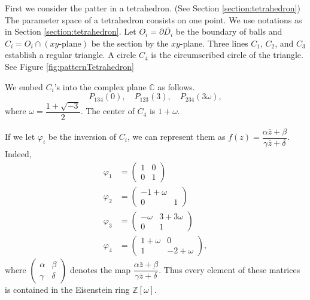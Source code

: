 \documentclass[suppldata, dvipdfmx]{interact}
\theoremstyle{plain}%
\theoremstyle{definition}
\theoremstyle{remark}
\theoremstyle{problemstyle}
\begin{document}
First we consider the patter in a tetrahedron. (See Section \ref{section:tetrahedron}) 
The parameter space of a tetrahedron consists on one point.
We use notations as in Section \ref{section:tetrahedron}.  
Let $O_i = \partial \overline{D_i}$ be the boundary of balls and $C_i= O_i\cap(xy\text{-plane})$ be the section by the $xy$-plane.  
Three lines $C_1$, $C_2$, and $C_3$ establish a regular triangle. 
A circle $C_4$ is the circumscribed circle of the triangle.  
See Figure \ref{fig:patternTetrahedron}

We embed $C_i$'s into the complex plane $\mathbb{C}$ as follows.
\[
P_{134}(0),\quad P_{123}(3),\quad P_{234}(3\omega),
\]
where $\omega = \dfrac{1+\sqrt{-3}}{2}$.  The center of $C_4$ is $1+\omega$.

If we let $\varphi_i$ be the inversion of $C_i$, we can represent them as
$f(z)=\dfrac{\alpha\bar z+\beta}{\gamma\bar z+\delta}$.  Indeed,
\begin{align*}
\varphi_1 &= \begin{pmatrix}  1&0 \\ 0&1\end{pmatrix}\\
\varphi_2 &= \begin{pmatrix}  -1+\omega& \\ 0&1\end{pmatrix}\\
\varphi_3 &= \begin{pmatrix}  -\omega&3+3\omega \\ 0&1\end{pmatrix}\\
\varphi_4 &= \begin{pmatrix}  1+\omega &0 \\ 1&-2+\omega\end{pmatrix},
\end{align*}
where $\begin{pmatrix} \alpha&\beta \\ \gamma&\delta\end{pmatrix}$ denotes the map $\dfrac{\alpha\bar z+\beta}{\gamma\bar z+\delta}$.
Thus every element of these matrices is contained in the Eisenstein ring $\mathbb{Z}[\omega]$.
\end{document}
